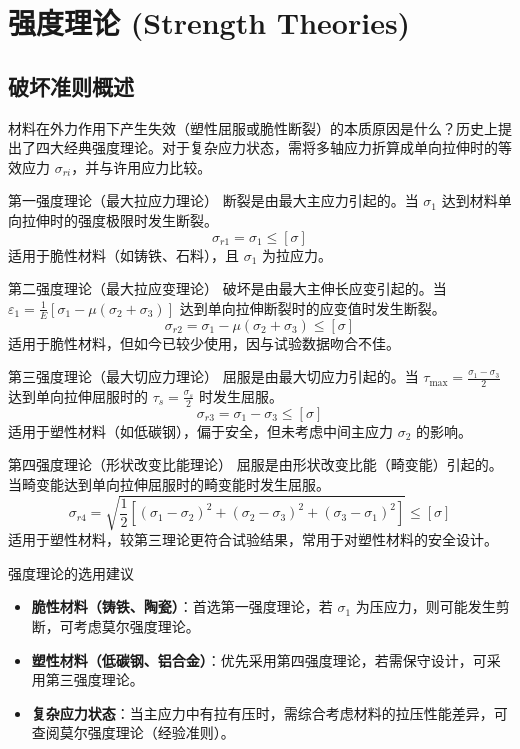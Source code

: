 \section{强度理论 (Strength Theories)}

\subsection{破坏准则概述}
材料在外力作用下产生失效（塑性屈服或脆性断裂）的本质原因是什么？历史上提出了四大经典强度理论。对于复杂应力状态，需将多轴应力折算成单向拉伸时的等效应力 $\sigma_{ri}$，并与许用应力比较。

\begin{mydefinition}{第一强度理论（最大拉应力理论）}
    断裂是由最大主应力引起的。当 $\sigma_1$ 达到材料单向拉伸时的强度极限时发生断裂。
    \[
    \sigma_{r1} = \sigma_1 \le [\sigma]
    \]
    适用于脆性材料（如铸铁、石料），且 $\sigma_1$ 为拉应力。
\end{mydefinition}

\begin{mydefinition}{第二强度理论（最大拉应变理论）}
    破坏是由最大主伸长应变引起的。当 $\varepsilon_1 = \frac{1}{E}[\sigma_1 - \mu(\sigma_2 + \sigma_3)]$ 达到单向拉伸断裂时的应变值时发生断裂。
    \[
    \sigma_{r2} = \sigma_1 - \mu(\sigma_2 + \sigma_3) \le [\sigma]
    \]
    适用于脆性材料，但如今已较少使用，因与试验数据吻合不佳。
\end{mydefinition}

\begin{mydefinition}{第三强度理论（最大切应力理论）}
    屈服是由最大切应力引起的。当 $\tau_{\max} = \frac{\sigma_1 - \sigma_3}{2}$ 达到单向拉伸屈服时的 $\tau_s = \frac{\sigma_s}{2}$ 时发生屈服。
    \[
    \sigma_{r3} = \sigma_1 - \sigma_3 \le [\sigma]
    \]
    适用于塑性材料（如低碳钢），偏于安全，但未考虑中间主应力 $\sigma_2$ 的影响。
\end{mydefinition}

\begin{mydefinition}{第四强度理论（形状改变比能理论）}
    屈服是由形状改变比能（畸变能）引起的。当畸变能达到单向拉伸屈服时的畸变能时发生屈服。
    \[
    \sigma_{r4} = \sqrt{\frac{1}{2}\left[(\sigma_1-\sigma_2)^2 + (\sigma_2-\sigma_3)^2 + (\sigma_3-\sigma_1)^2\right]} \le [\sigma]
    \]
    适用于塑性材料，较第三理论更符合试验结果，常用于对塑性材料的安全设计。
\end{mydefinition}

\begin{myhypothesis}{强度理论的选用建议}
    \begin{itemize}
        \item \textbf{脆性材料（铸铁、陶瓷）}：首选第一强度理论，若 $\sigma_1$ 为压应力，则可能发生剪断，可考虑莫尔强度理论。
        \item \textbf{塑性材料（低碳钢、铝合金）}：优先采用第四强度理论，若需保守设计，可采用第三强度理论。
        \item \textbf{复杂应力状态}：当主应力中有拉有压时，需综合考虑材料的拉压性能差异，可查阅莫尔强度理论（经验准则）。
    \end{itemize}
\end{myhypothesis}

